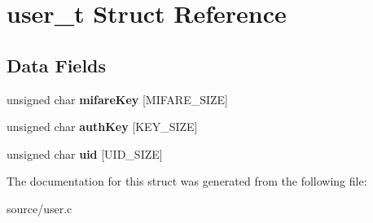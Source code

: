 \hypertarget{structuser__t}{}\section{user\+\_\+t Struct Reference}
\label{structuser__t}
\subsection*{Data Fields}
\begin{DoxyCompactItemize}
\item 
\mbox{\label{structuser__t_a319c6ef936319307265e5745afb99418}} 
unsigned char {\bfseries mifare\+Key} \mbox{[}M\+I\+F\+A\+R\+E\+\_\+\+S\+I\+ZE\mbox{]}
\item 
\mbox{\label{structuser__t_a179a3b28c2334eccadec5e20a92edf02}} 
unsigned char {\bfseries auth\+Key} \mbox{[}K\+E\+Y\+\_\+\+S\+I\+ZE\mbox{]}
\item 
\mbox{\label{structuser__t_a77a3377375fa3d583b090c2de9e93633}} 
unsigned char {\bfseries uid} \mbox{[}U\+I\+D\+\_\+\+S\+I\+ZE\mbox{]}
\end{DoxyCompactItemize}


The documentation for this struct was generated from the following file\+:\begin{DoxyCompactItemize}
\item 
source/user.\+c\end{DoxyCompactItemize}
